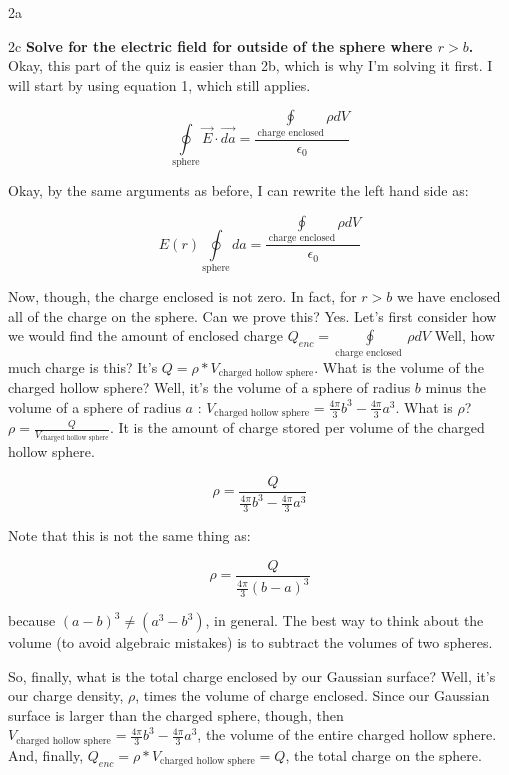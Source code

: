 \begin{homeworkProblem}[Quiz 3, Pr. 2]
\begin{homeworkSection}{2a}
    \end{homeworkSection}
    \begin{homeworkSection}{2c}
        \textbf{Solve for the electric field for outside of the sphere
        where $r>b$.}
        \\

        Okay, this part of the quiz is easier than 2b, which is why I'm
        solving it first. I will start by using equation 1, which still
        applies.
        
        \[
            \oint\limits_{\text{sphere}} \vec{E}\cdot\vec{da} =
            \frac{\oint\limits_{\text{charge enclosed}}\rho dV}{\epsilon_0}
        \]

        Okay, by the same arguments as before, I can rewrite the left
        hand side as:

        \[
            E(r)\oint\limits_{\text{sphere}} da =
            \frac{\oint\limits_{\text{charge enclosed}}\rho dV}{\epsilon_0}
        \]

        Now, though, the charge enclosed is not zero. In fact, for $r>b$
        we have enclosed all of the charge on the sphere. Can we prove
        this? Yes. Let's first consider how we would find the amount of
        enclosed charge $Q_{enc} = \oint\limits_{\text{charge enclosed
        }}\rho dV$ Well, how much charge is this? It's
        $Q = \rho * V_{\text{charged hollow sphere}}$.        What is
        the volume of the charged hollow sphere? Well, it's the volume
        of a sphere of radius $b$ minus the volume of a sphere of radius
        $a$ : $V_{\text{charged hollow sphere}} = \frac{4\pi}{3}b^3 -
        \frac{4\pi}{3}a^3$. What is $\rho$? $\rho =
        \frac{Q}{V_{\text{charged hollow sphere}}}$. It is the amount of
        charge stored per volume of the charged hollow sphere.
    
        \[
        \rho = \frac{Q}{\frac{4\pi}{3}b^3 - \frac{4\pi}{3}a^3}
        \]

        Note that this is not the same thing as:
       
        \[ \rho = \frac{Q}{\frac{4\pi}{3}(b - a)^3} \]
        
        because $(a-b)^3 \ne (a^3-b^3)$, in general. The best way to
        think about the volume (to avoid algebraic mistakes) is to
        subtract the volumes of two spheres.

        So, finally, what is the total charge enclosed by our Gaussian
        surface? Well, it's our charge density, $\rho$, times the volume
        of charge enclosed. Since our Gaussian surface is larger than
        the charged sphere, though, then $V_{\text{charged hollow
        sphere}} = \frac{4\pi}{3}b^3 - \frac{4\pi}{3}a^3$, the volume of
        the entire charged hollow sphere. And, finally, $Q_{enc} =
        \rho*V_{\text{charged hollow sphere}} = Q$, the total charge on the
        sphere.


\end{homeworkSection}
\end{homeworkProblem}
